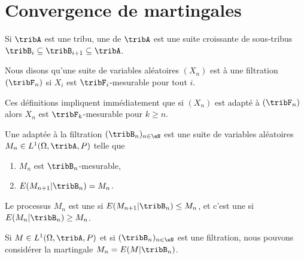 
\section{Convergence de martingales}

\begin{definition}
    Si \( \tribA\) est une tribu, une  de \( \tribA\) est une suite croissante de sous-tribus \( \tribB_i\subseteq\tribB_{i+1}\subseteq\tribA\).

    Nous disons qu'une suite de variables aléatoires \( (X_n)\) est  à une filtration \( (\tribF_n)\) si \( X_i\) est \( \tribF_i\)-mesurable pour tout \( i\).
\end{definition}

Ces définitions impliquent immédiatement que si \( (X_n)\) est adapté à \( (\tribF_n)\) alors \( X_n\) est \( \tribF_k\)-mesurable pour \( k\geq n\).

\begin{definition}
    Une  adaptée à la filtration \( (\tribB_n)_{n\in \eN}\) est une suite de variables aléatoires \( M_n\in L^1(\Omega,\tribA,P)\) telle que
    \begin{enumerate}
        \item
            \( M_n\) est \( \tribB_n\)-mesurable,
        \item
            \( E(M_{n+1}|\tribB_n)=M_n\).
    \end{enumerate}

    Le processus \( M_n\) est une  si \( E(M_{n+1}|\tribB_n)\leq M_n\), et c'est une  si \( E(M_n|\tribB_n)\geq M_n\).
\end{definition}

\begin{example}
    Si \( M\in L^1(\Omega,\tribA,P)\) et si \( (\tribB_n)_{n\in \eN}\) est une filtration, nous pouvons considérer la martingale \( M_n=E(M|\tribB_n)\).
\end{example}


